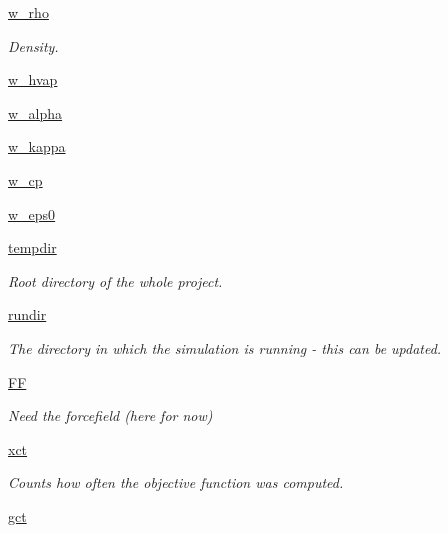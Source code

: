 \begin{DoxyCompactItemize}
\item 
\hyperlink{classforcebalance_1_1liquid_1_1Liquid_aef8ad1dda086bde6f48130d273af9784}{w\-\_\-rho}
\begin{DoxyCompactList}\small\item\em Density. \end{DoxyCompactList}\item 
\hyperlink{classforcebalance_1_1liquid_1_1Liquid_abe985fe3aaa03d9f3a1b0a90f26b774d}{w\-\_\-hvap}
\item 
\hyperlink{classforcebalance_1_1liquid_1_1Liquid_a0d36d27d8c406b53bbb1096fbb76adbb}{w\-\_\-alpha}
\item 
\hyperlink{classforcebalance_1_1liquid_1_1Liquid_a6b262d9343247a902063bf62d5f19108}{w\-\_\-kappa}
\item 
\hyperlink{classforcebalance_1_1liquid_1_1Liquid_a3809c649d95ac6c9f662d599e6b1b93d}{w\-\_\-cp}
\item 
\hyperlink{classforcebalance_1_1liquid_1_1Liquid_a75ad3ea94ec845e91499f858e7be5f27}{w\-\_\-eps0}
\item 
\hyperlink{classforcebalance_1_1target_1_1Target_aa1f01b5b78db253b5b66384ed11ed193}{tempdir}
\begin{DoxyCompactList}\small\item\em Root directory of the whole project. \end{DoxyCompactList}\item 
\hyperlink{classforcebalance_1_1target_1_1Target_a6872de5b2d4273b82336ea5b0da29c9e}{rundir}
\begin{DoxyCompactList}\small\item\em The directory in which the simulation is running -\/ this can be updated. \end{DoxyCompactList}\item 
\hyperlink{classforcebalance_1_1target_1_1Target_a38a37919783141ea37fdcf8b00ce0aaf}{F\-F}
\begin{DoxyCompactList}\small\item\em Need the forcefield (here for now) \end{DoxyCompactList}\item 
\hyperlink{classforcebalance_1_1target_1_1Target_aad2e385cfbf7b4a68f1c2cb41133fe82}{xct}
\begin{DoxyCompactList}\small\item\em Counts how often the objective function was computed. \end{DoxyCompactList}\item 
\hyperlink{classforcebalance_1_1target_1_1Target_aa625ac88c6744eb14ef281d9496d0dbb}{gct}

\end{DoxyCompactItemize}
